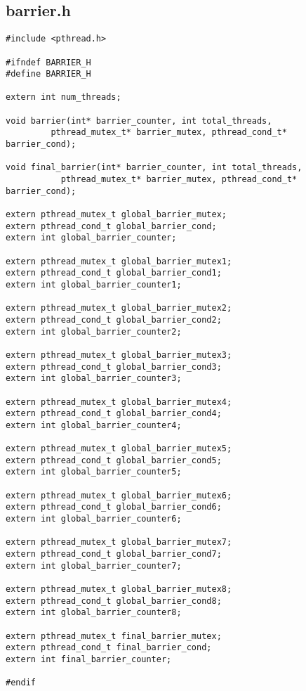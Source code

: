 \documentclass[]{article}
\begin{document}
\subsection{barrier.h}
\begin{verbatim}
#include <pthread.h>

#ifndef BARRIER_H
#define BARRIER_H

extern int num_threads;

void barrier(int* barrier_counter, int total_threads, 
	     pthread_mutex_t* barrier_mutex, pthread_cond_t* barrier_cond);

void final_barrier(int* barrier_counter, int total_threads, 
		   pthread_mutex_t* barrier_mutex, pthread_cond_t* barrier_cond);

extern pthread_mutex_t global_barrier_mutex;
extern pthread_cond_t global_barrier_cond;
extern int global_barrier_counter;

extern pthread_mutex_t global_barrier_mutex1;
extern pthread_cond_t global_barrier_cond1;
extern int global_barrier_counter1;

extern pthread_mutex_t global_barrier_mutex2;
extern pthread_cond_t global_barrier_cond2;
extern int global_barrier_counter2;

extern pthread_mutex_t global_barrier_mutex3;
extern pthread_cond_t global_barrier_cond3;
extern int global_barrier_counter3;

extern pthread_mutex_t global_barrier_mutex4;
extern pthread_cond_t global_barrier_cond4;
extern int global_barrier_counter4;

extern pthread_mutex_t global_barrier_mutex5;
extern pthread_cond_t global_barrier_cond5;
extern int global_barrier_counter5;

extern pthread_mutex_t global_barrier_mutex6;
extern pthread_cond_t global_barrier_cond6;
extern int global_barrier_counter6;

extern pthread_mutex_t global_barrier_mutex7;
extern pthread_cond_t global_barrier_cond7;
extern int global_barrier_counter7;

extern pthread_mutex_t global_barrier_mutex8;
extern pthread_cond_t global_barrier_cond8;
extern int global_barrier_counter8;

extern pthread_mutex_t final_barrier_mutex;
extern pthread_cond_t final_barrier_cond;
extern int final_barrier_counter;

#endif
\end{verbatim}
\end{document}
